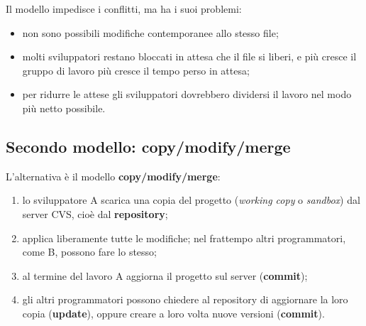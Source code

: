 \begin{center}
\end{center}

Il modello impedisce i conflitti, ma ha i suoi problemi:

\begin{itemize}
  \item non sono possibili modifiche contemporanee allo stesso file;
  \item molti sviluppatori restano bloccati in attesa che il file si liberi, e più cresce il gruppo di lavoro più
        cresce il tempo perso in attesa;
  \item per ridurre le attese gli sviluppatori dovrebbero dividersi il lavoro nel modo più netto possibile.
\end{itemize}

\subsection{Secondo modello: copy/modify/merge}

L'alternativa è il modello \textbf{copy/modify/merge}:

\begin{enumerate}
  \item lo sviluppatore A scarica una copia del progetto (\textit{working copy} o \textit{sandbox}) dal server CVS,
        cioè dal \textbf{repository};
  \item applica liberamente tutte le modifiche; nel frattempo altri programmatori, come B, possono fare lo stesso;
  \item al termine del lavoro A aggiorna il progetto sul server (\textbf{commit});
  \item gli altri programmatori possono chiedere al repository di aggiornare la loro copia (\textbf{update}), oppure
        creare a loro volta nuove versioni (\textbf{commit}).
\end{enumerate}

